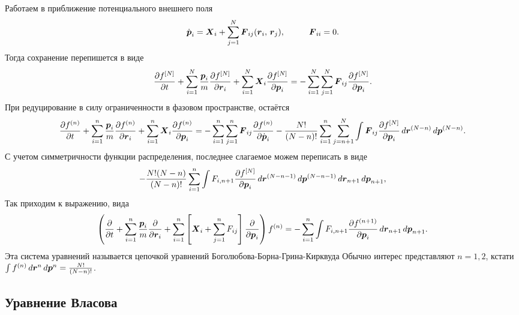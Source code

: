 Работаем в приближение потенциального внешнего поля
\begin{equation*}
	\dot{\vc{p}}_i = \vc{X}_i + \sum_{j=1}^{N} \vc{F}_{ij} (\vc{r}_i,\, \vc{r}_j),
	\hspace{10 mm} 
	\vc{F}_{ii} = 0.
\end{equation*}
Тогда сохранение перепишется в виде
\begin{equation*}
	\frac{\partial f^{[N]}}{\partial t} + \sum_{i=1}^{N} \frac{\boldsymbol{p}_i}{m} \frac{\partial f^{[N]}}{\partial \boldsymbol{r}_i} + \sum_{i=1}^{N} \boldsymbol{X}_i \frac{\partial f^{[N]}}{\partial \boldsymbol{p}_i} = -
	\sum_{i=1}^{N} \sum_{j=1}^{N} \boldsymbol{F}_{ij} \frac{\partial f^{[N]}}{\partial \boldsymbol{p}_i}.
\end{equation*}
При редуцирование в силу ограниченности в фазовом пространстве, остаётся
\begin{equation*}
	\frac{\partial f^{(n)}}{\partial t} + \sum_{i=1}^{n} \frac{\boldsymbol{p}_i}{m} \frac{\partial f^{(n)}}{\partial \boldsymbol{r}_i} + \sum_{i=1}^{n} \boldsymbol{X}_i \frac{\partial f^{(n)}}{\partial \boldsymbol{p}_i} = - \sum_{i=1}^{n} \sum_{j=1}^{n} \boldsymbol{F}_{ij} \frac{\partial f^{(n)}}{\partial \dot{\boldsymbol{p}}_i} - \frac{N!}{(N-n)!} \sum_{i=1}^{n} \sum_{j=n+1}^{N} \int \boldsymbol{F}_{ij} \frac{\partial f^{[N]}}{\partial \boldsymbol{p}_i} \, d \boldsymbol{r}^{(N-n)} \, d \boldsymbol{p}^{(N-n)}.
\end{equation*}
С учетом симметричности функции распределения, последнее слагаемое можем переписать в виде
\begin{equation*}
	- \frac{N! (N-n)}{(N-n)!} \sum_{i=1}^{n} \int F_{i, n+1} \frac{\partial f^{[N]}}{\partial \boldsymbol{p}_i} \, d \boldsymbol{r}^{(N-n-1)} \, d \boldsymbol{p}^{(N-n-1)} \, d \boldsymbol{r}_{n+1} \, d \boldsymbol{p}_{n+1},
\end{equation*}
Так приходим к выражению, вида
\begin{equation}
	\left(
		\frac{\partial }{\partial t} + \sum_{i=1}^{n} \frac{\boldsymbol{p}_i}{m} \frac{\partial }{\partial \boldsymbol{r}_i} + \sum_{i=1}^{n} \left[
			\boldsymbol{X}_i + \sum_{j=1}^{n} F_{ij}
		\right] \frac{\partial }{\partial \boldsymbol{p}_i} 
	\right) f^{(n)} = - \sum_{i=1}^{n} \int F_{i, n+1} \frac{\partial f^{(n+1)}}{\partial \boldsymbol{p}_i} \, d \boldsymbol{r}_{n+1} \, d \boldsymbol{p}_{n+1}.
\end{equation}
Эта система уравнений называется цепочкой уравнений Боголюбова-Борна-Грина-Кирквуда 
Обычно интерес представляют $n = 1, 2$, кстати $\int f^{(n)} \, d \boldsymbol{r}^{n} \, d \boldsymbol{p}^n = \frac{N!}{(N-n)!}$.

\subsection{Уравнение Власова}

